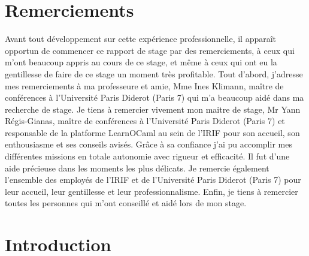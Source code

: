 \documentclass{article}
\begin{document}
\newpage

\tableofcontents
\newpage

\section{Remerciements}
Avant tout développement sur cette expérience professionnelle, il apparaît opportun de commencer ce rapport de stage par des remerciements, à ceux qui m’ont beaucoup appris au cours de ce stage, et même à ceux qui ont eu la gentillesse de faire de ce stage un moment très profitable.
\newline
Tout d'abord, j'adresse mes remerciements à ma professeure et amie, Mme Ines Klimann, maître de conférences à l'Université Paris Diderot (Paris 7) qui m'a beaucoup aidé dans ma recherche de stage.
\newline
Je tiens à remercier vivement mon maitre de stage, Mr Yann Régis-Gianas, maître de conférences à l'Université Paris Diderot (Paris 7) et responsable de la platforme LearnOCaml au sein de l'IRIF pour son accueil, son enthousiasme et ses conseils avisés. Grâce à sa confiance j'ai pu accomplir mes différentes missions en totale autonomie avec rigueur et efficacité. Il fut d'une aide précieuse dans les moments les plus délicats.
\newline
Je remercie également l'ensemble des employés de l'IRIF et de l'Université Paris Diderot (Paris 7) pour leur accueil, leur gentillesse et leur professionnalisme.
Enfin, je tiens à remercier toutes les personnes qui m'ont conseillé et aidé lors de mon stage.


\newpage

\section{Introduction}
\end{document}
